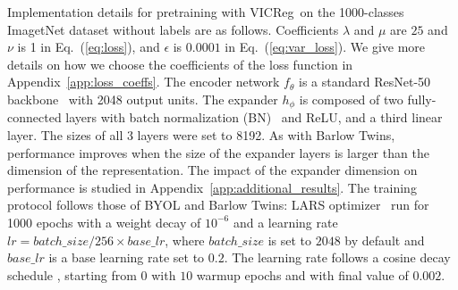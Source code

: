 \documentclass{article}
\newcommand{\algo}{VICReg}
\begin{document}
Implementation details for pretraining with \algo \ on the 1000-classes ImagetNet dataset without labels are as follows. Coefficients $\lambda$ and $\mu$ are $25$ and $\nu$ is 1 in Eq.~(\ref{eq:loss}), and $\epsilon$ is $0.0001$ in Eq.~(\ref{eq:var_loss}). We give more details on how we choose the coefficients of the loss function in Appendix~\ref{app:loss_coeffs}. The encoder network $f_{\theta}$ is a standard ResNet-50 backbone~\cite{he2016resnet} with 2048 output units. The expander $h_{\phi}$ is composed of two fully-connected layers with batch normalization (BN)~\cite{ioffe2015bn} and ReLU, and a third linear layer. The sizes of all 3 layers were set to 8192. As with Barlow Twins, performance improves when the size of the expander layers is larger than the dimension of the representation. The impact of the expander dimension on performance is studied in Appendix~\ref{app:additional_results}. The training protocol follows those of BYOL and Barlow Twins: LARS optimizer~\cite{you2017lars, goyal2017lars} run for 1000 epochs with a weight decay of $10^{-6}$ and a learning rate $lr = batch\_size / 256 \times base\_lr$, where $batch\_size$ is set to $2048$ by default and $base\_lr$ is a base learning rate set to $0.2$. The learning rate follows a cosine decay schedule \cite{loshchilov2017sgdr}, starting from $0$ with $10$ warmup epochs and with final value of $0.002$.
\end{document}
